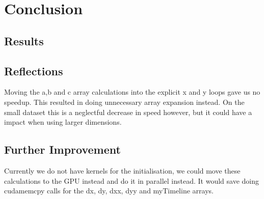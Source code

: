 \section{Conclusion}
\subsection{Results}
\subsection{Reflections}
Moving the a,b and c array calculations into the explicit x and y loops gave us no speedup. This resulted in doing unnecessary  array expansion instead. On the small dataset this is a neglectful decrease in speed however, but it could have a impact when using larger dimensions. 

\subsection{Further Improvement}
Currently we do not have kernels for the initialisation, we could move these calculations to the GPU instead and do it in parallel instead. It would save doing cudamemcpy calls for the dx, dy, dxx, dyy and myTimeline arrays.